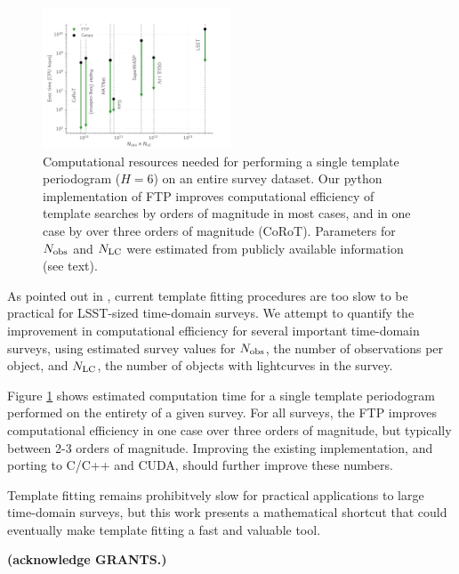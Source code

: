 \documentclass[apj]{emulateapj}
\newcommand{\todo}[1]{{\bf #1}}
\begin{document}
\begin{figure}
\centering
\includegraphics[width=0.5\textwidth]{plots/timing_for_various_surveys.pdf}
\caption{\label{fig:surveys} Computational resources needed for performing 
a single template periodogram ($H=6$) on an entire survey dataset. Our
python implementation of FTP improves computational efficiency of template 
searches by orders of magnitude in most cases, and in one case by over 
three orders of magnitude (CoRoT). Parameters for $N_{\rm obs}$ and $N_{\rm LC}$
were estimated from publicly available information (see text).}
\end{figure}

As pointed out in \cite{Vanderplas+Ivezic_2015}, current template fitting
procedures are too slow to be practical for LSST-sized time-domain surveys.
We attempt to quantify the improvement in computational efficiency for
several important time-domain surveys, using estimated survey values for 
$N_{\rm obs}$, the number of observations per object, and $N_{\rm LC}$, 
the number of objects with lightcurves in the survey. 

Figure \ref{fig:surveys} shows estimated computation time for a single
template periodogram performed on the entirety of a given survey. For all
surveys, the FTP improves computational efficiency in one case over
three orders of magnitude, but typically between 2-3 orders of magnitude.
Improving the existing implementation, and porting to C/C++ and CUDA,
should further improve these numbers.

Template fitting remains prohibitvely slow for practical applications to
large time-domain surveys, but this work presents a mathematical shortcut
that could eventually make template fitting a fast and valuable tool.

\begin{acknowledgements}
\todo{(acknowledge GRANTS.)}
\end{acknowledgements}



\end{document}
